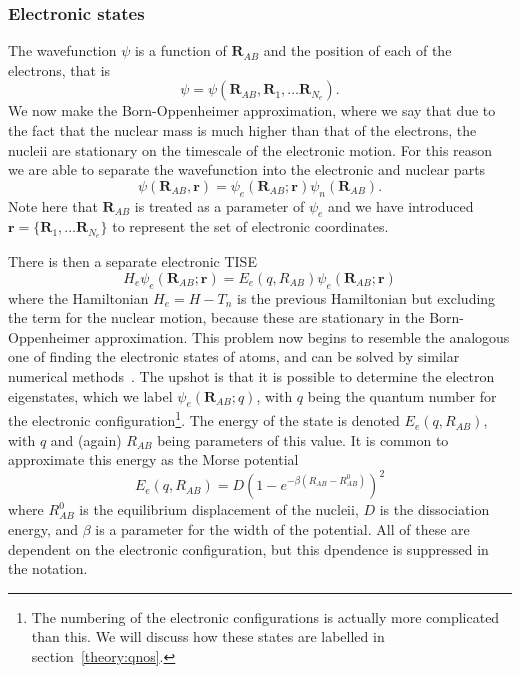 \subsubsection{Electronic states}

The wavefunction
$\psi$ is a function of $\mathbf{R}_{AB}$ and the position of each of the
electrons, that is
%
\begin{equation}
  \psi = \psi(\mathbf{R}_{AB}, \mathbf{R}_1, \dots \mathbf{R}_{N_e}).
\end{equation}
%
We now make the Born-Oppenheimer approximation, where we say that due to the
fact that the nuclear mass is much higher than that of the electrons, the
nucleii are stationary on the timescale of the electronic motion. For this
reason we are able to separate the wavefunction into the electronic and nuclear
parts
%
\begin{equation}
  \psi(\mathbf{R}_{AB}, \mathbf{r}) = \psi_e(\mathbf{R}_{AB}; \mathbf{r})
  \psi_n(\mathbf{R}_{AB}).
\end{equation}
%
Note here that $\mathbf{R}_{AB}$ is treated as a parameter of $\psi_e$ and we
have introduced $\mathbf{r} = \{\mathbf{R}_1, \dots \mathbf{R}_{N_e} \}$ to
represent the set of electronic coordinates.

There is then a separate electronic TISE
%
\begin{equation}
  H_e \psi_e(\mathbf{R}_{AB}; \mathbf{r}) = E_e(q, R_{AB})\psi_e(\mathbf{R}_{AB};
  \mathbf{r})
  \label{theory:eqn:TISEelectron}
\end{equation}
%
where the Hamiltonian $H_e = H - T_n$ is the previous Hamiltonian but excluding
the term for the nuclear motion, because these are stationary in the
Born-Oppenheimer approximation. This problem now begins to resemble the
analogous one of finding the electronic states of atoms, and can be solved by
similar numerical methods~\cite{Foot2005}. The upshot is that it is possible to
determine the electron eigenstates, which we label $\psi_e(\mathbf{R}_{AB};
q)$, with $q$ being the quantum number for the electronic
configuration\footnote{The numbering of the electronic configurations is
actually more complicated than this. We will discuss how these states are
labelled in section~\ref{theory:qnos}.}. The
energy of the state is denoted $E_e(q, R_{AB})$, with $q$ and (again) $R_{AB}$
being
parameters of this value. It is common to approximate this energy as
the Morse potential
%
\begin{equation}
  E_e(q, R_{AB}) = D(1-e^{-\beta(R_{AB} - R_{AB}^0)})^2
\end{equation}
%
where $R_{AB}^0$ is the equilibrium displacement of the nucleii, $D$ is the
dissociation energy, and $\beta$ is a parameter for the width of the
potential. All of these are dependent on the electronic configuration, but this
dpendence is suppressed in the notation.

